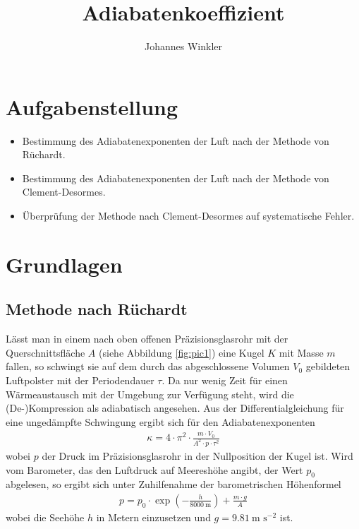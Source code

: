 \documentclass{article}
\title{Adiabatenkoeffizient}
\author{Johannes Winkler}
\date{}
\begin{document}
 
 
 
\pagestyle{fancy}


\tableofcontents

\newpage


\section{Aufgabenstellung}

\begin{itemize}
\item Bestimmung des Adiabatenexponenten der Luft nach der Methode von Rüchardt.
\item Bestimmung des Adiabatenexponenten der Luft nach der Methode von Clement-Desormes.
\item Überprüfung der Methode nach Clement-Desormes auf systematische Fehler.
\end{itemize}



\section{Grundlagen}

\subsection{Methode nach Rüchardt}
Lässt man in einem nach oben offenen Präzisionsglasrohr mit der Querschnittsfläche $A$ (siehe Abbildung \ref{fig:pic1}) eine Kugel $K$ mit Masse $m$ fallen, so schwingt sie auf dem durch das abgeschlossene Volumen $V_0$ gebildeten Luftpolster mit der Periodendauer $\tau$. Da nur wenig Zeit für einen Wärmeaustausch mit der Umgebung zur Verfügung steht, wird die (De-)Kompression als adiabatisch angesehen. Aus der Differentialgleichung für eine ungedämpfte Schwingung ergibt sich für den Adiabatenexponenten
\begin{align}
\label{eq:kappa1}
\kappa = 4\cdot \pi^2 \cdot \frac{m\cdot V_0}{A^2\cdot p\cdot \tau^2}
\end{align}
wobei $p$ der Druck im Präzisionsglasrohr in der Nullposition der Kugel ist. Wird vom Barometer, das den Luftdruck auf Meereshöhe angibt, der Wert $p_0$ abgelesen, so ergibt sich unter Zuhilfenahme der barometrischen Höhenformel
\begin{align}
p = p_0 \cdot \exp\left(-\frac{h}{8000~\text{m}}\right) + \frac{m\cdot g}{A}
\end{align}
wobei die Seehöhe $h$ in Metern einzusetzen und $g = 9.81~\text{m s}^{-2}$ ist.
\end{document}
